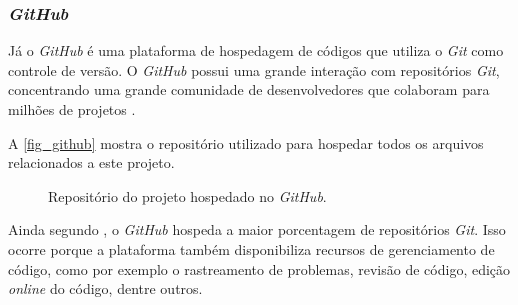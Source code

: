 \subsubsection{\textit{GitHub}}


Já o \textit{GitHub} é uma plataforma de hospedagem de códigos que utiliza o \textit{Git} como controle de versão. O \textit{GitHub} possui uma grande interação com repositórios \textit{Git}, concentrando uma grande comunidade de desenvolvedores que colaboram para milhões de projetos \cite{CHACON2014}.

A \autoref{fig_github} mostra o repositório utilizado para hospedar todos os arquivos relacionados a este projeto.

\begin{figure}[h]
	\caption{\label{fig_github}Repositório do projeto hospedado no \textit{GitHub}.}
	\begin{center}
	\end{center}
	\centering {}
\end{figure}

Ainda segundo , o \textit{GitHub} hospeda a maior porcentagem de repositórios \textit{Git}. Isso ocorre porque a plataforma também disponibiliza recursos de gerenciamento de código, como por exemplo o rastreamento de problemas, revisão de código, edição \textit{online} do código, dentre outros.